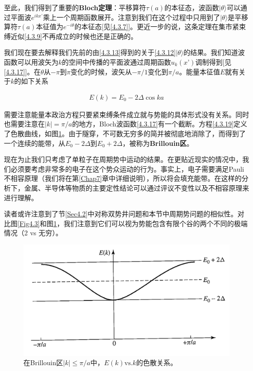 \documentclass[UTF8,twoside]{ctexart}
\begin{document}
至此，我们得到了重要的{\bf Bloch定理}：平移算符$\tau(a)$的本征态，波函数$|\theta\rangle$可以通过平面波$e^{ikx’}$乘上一个周期函数展开。注意到我们在这个过程中只用到了$|\theta\rangle$是平移算符$\tau(a)$本征值为$e^{-i\theta}$的本征态[见\eqref{4.3.7}]。更近一步的说，这条定理在集市紧束缚近似\eqref{4.3.9}不再成立的时候也还是正确的。

我们现在要去解释我们先前的由\eqref{4.3.13}得到的关于\eqref{4.3.12}$|\theta\rangle$的结果。我们知道波函数可以用波矢为$k$的空间中传播的平面波通过周期函数$u_k(x’)$调制得到[见\eqref{4.3.17}]。在$\theta$从$-\pi$到$\pi$变化的时候，波矢从$-\pi/1$变化到$\pi/a$。能量本征值$E$就有关于$k$的如下关系

\begin{align}\label{4.3.19}
E(k) = E_0-2\Delta\cos ka
\end{align}

需要注意能量本政治方程只要紧束缚条件成立就与势能的具体形式没有关系。同时也需要注意在$|k|=\pi/a$的地方，Bloch波函数\eqref{4.3.17}有一个截断。方程\eqref{4.3.19}定义了色散曲线，如图\ref{Fig4.9}。由于隧穿，不可数无穷多的简并被彻底地消除了，而得到了一个连续的能带，从$E_0-2\Delta$到$E_0+2\Delta$，被称为{\bf Brillouin区}。

现在为止我们只考虑了单粒子在周期势中运动的结果。在更贴近现实的情况中，我们必须要考虑非常多的电子在这个势众运动的行为。事实上，电子需要满足Pauli不相容原理（我们将在第\ref{Chap7}章中详细说明），所以将会填充能带。在这样的分析下，金属、半导体等物质的主要定性结论可以通过评议不变性以及不相容原理来进行理解。

读者或许注意到了节\ref{Sec4.2}中对称双势井问题和本节中周期势问题的相似性。对比图\ref{Fig4.3}和图\ref{Fig4.9}，我们注意到它们可以视为势能包含有限个谷的两个不同的极端情况（2 vs 无穷）。

\begin{figure}[htbp]
\begin{centering}
\includegraphics[width = 12.4cm]{./Sakurai/Fig_4.9.png}
\caption{在Brillouin区$|k|\le\pi/a$中，$E(k) \text{vs.} k$的色散关系。}
\label {Fig4.9}
\end{centering}
\end{figure}
\end{document}
